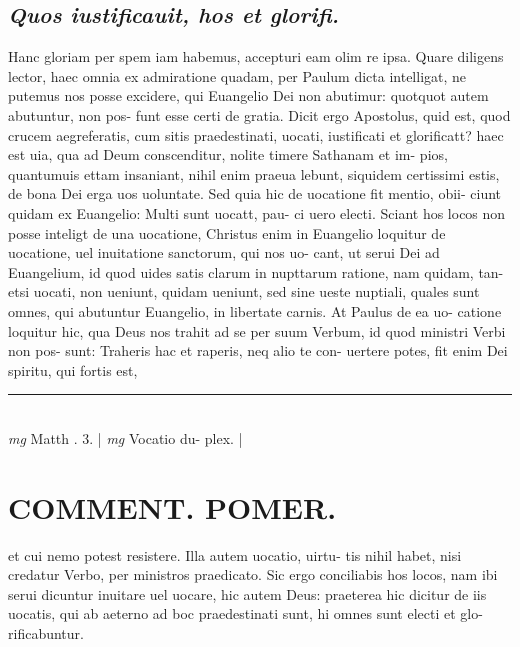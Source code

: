 \documentclass{article}
\begin{document}
\begin{pages}
\subsection*{\textit{Quos iustificauit, hos et glorifi. }}\pstart Hanc gloriam per spem iam habemus, accepturi eam olim re ipsa. Quare diligens lector, haec omnia ex admiratione quadam, per Paulum dicta intelligat, ne putemus nos posse excidere, qui Euangelio Dei non abutimur: quotquot autem abutuntur, non pos- funt esse certi de gratia. Dicit ergo Apostolus, quid est, quod crucem aegreferatis, cum sitis praedestinati, uocati, iustificati et glorificatt? haec est uia, qua ad Deum conscenditur, nolite timere Sathanam et im- pios, quantumuis ettam insaniant, nihil enim praeua lebunt, siquidem certissimi estis, de bona Dei erga uos uoluntate. Sed quia hic de uocatione fit mentio, obii- ciunt quidam ex Euangelio: Multi sunt uocatt, pau- ci uero electi. Sciant hos locos non posse inteligt de una uocatione, Christus enim in Euangelio loquitur de uocatione, uel inuitatione sanctorum, qui nos uo- cant, ut serui Dei ad Euangelium, id quod uides satis clarum in nupttarum ratione, nam quidam, tan- etsi uocati, non ueniunt, quidam ueniunt, sed sine ueste nuptiali, quales sunt omnes, qui abutuntur Euangelio, in libertate carnis. At Paulus de ea uo- catione loquitur hic, qua Deus nos trahit ad se per suum Verbum, id quod ministri Verbi non pos- sunt: Traheris hac et raperis, neq alio te con- uertere potes, fit enim Dei spiritu, qui fortis est,  \pend
\vspace{0.5cm}\noindent
\vspace{0.2cm}\rule{1cm}{0.2pt}\\ 
\hspace{0.2cm}\textit{mg}
\footnotesize Matth . 3.  
\normalsize| 
\hspace{0.2cm}\textit{mg}
\footnotesize Vocatio du- plex. 
\normalsize| 
\section*{COMMENT. POMER.  }\pstart et cui nemo potest resistere. Illa autem uocatio, uirtu- tis nihil habet, nisi credatur Verbo, per ministros praedicato. Sic ergo conciliabis hos locos, nam ibi serui dicuntur inuitare uel uocare, hic autem Deus: praeterea hic dicitur de iis uocatis, qui ab aeterno ad boc praedestinati sunt, hi omnes sunt electi et glo- rificabuntur.   \pend
{}
{}

\end{pages}
\end{document}

